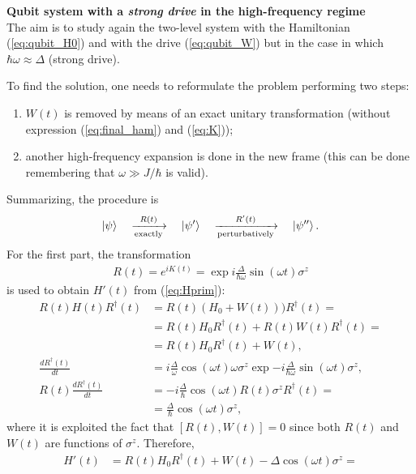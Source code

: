 \begin{tcolorbox}
\textbf{Qubit system with a \textit{strong drive} in the high-frequency regime} \\
The aim is to study again the two-level system with the Hamiltonian (\ref{eq:qubit_H0}) and with the drive (\ref{eq:qubit_W}) but in the case in which $\hbar \omega \approx \Delta$ (strong drive).

To find the solution, one needs to reformulate the problem performing two steps: 
\begin{enumerate}
    \item $W(t)$ is removed by means of an exact unitary transformation (without expression (\ref{eq:final_ham}) and (\ref{eq:K}));
    \item another high-frequency expansion is done in the new frame (this can be done remembering that $\omega \gg J/\hbar$ is valid). 
\end{enumerate}
Summarizing, the procedure is
\begin{align*}
    \ket{\psi} \quad \xrightarrow[\text{exactly}]{R(t)} \quad \ket{\psi'} \quad \xrightarrow [\text{perturbatively}]{R'(t)} \quad \ket{\psi''}.
\end{align*}
For the first part, the transformation
\begin{align*}
    R(t) = e^{i K(t)} = \exp{i \frac{\Delta}{\hbar \omega} \sin{(\omega t)} \sigma^z}
\end{align*}
is used to obtain $H'(t)$ from (\ref{eq:Hprim}):
\begin{align*}
    R(t) H(t) R^\dagger(t) &= R(t) (H_0 + W(t)) ) R^\dagger(t) = \\
    &= R(t) H_0 R^\dagger(t) + R(t) W(t) R^\dagger(t) = \\
    &= R(t) H_0 R^\dagger(t) + W(t), \\
    \frac{dR^\dagger(t)}{dt} &= i \frac{\Delta}{\omega} \cos{(\omega t)} \omega \sigma^z \exp{-i\frac{\Delta}{\hbar \omega} \sin{(\omega t)} \sigma^z}, \\
    R(t) \frac{dR^\dagger(t)}{dt} &= -i\frac{\Delta}{\hbar} \cos{(\omega t)} R(t) \sigma^z R^\dagger(t) = \\
    &= \frac{\Delta}{\hbar} \cos{(\omega t)} \sigma^z,
\end{align*}
where it is exploited the fact that $[R(t),W(t)] = 0$ since both $R(t)$ and $W(t)$ are functions of $\sigma^z$. Therefore, 
\begin{align*}
    H'(t) &= R(t) H_0 R^\dagger(t) + W(t) - \Delta \cos{(\omega t)} \sigma^z = \\

\end{align*}
\end{tcolorbox}
